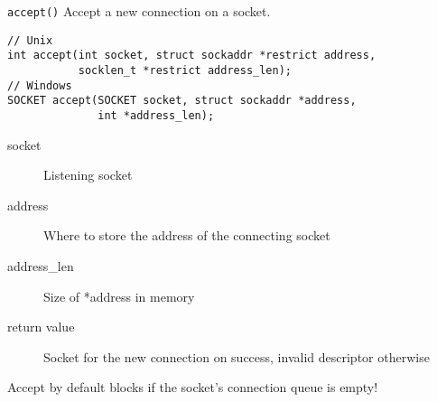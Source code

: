 \begin{frame}[fragile]{\texttt{accept()}}
    Accept a new connection on a socket.
    \begin{lstlisting}[numbers=none,morekeywords={*,SOCKET,sockaddr,socklen_t}]
// Unix
int accept(int socket, struct sockaddr *restrict address,
           socklen_t *restrict address_len);
// Windows
SOCKET accept(SOCKET socket, struct sockaddr *address,
              int *address_len);
\end{lstlisting}
    \begin{description}
        \item[socket] Listening socket
        \item[address] Where to store the address of the
            connecting socket
        \item[address\_len] Size of *address in memory
        \item[return value] Socket for the new connection on success, invalid
            descriptor otherwise
    \end{description}
    \bigskip
    Accept by default blocks if the socket's connection queue is empty!
\end{frame}



